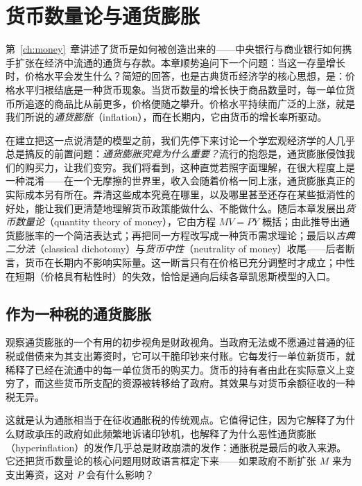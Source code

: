 \chapter{货币数量论与通货膨胀}
\label{ch:quantity}

第~\ref{ch:money}~章讲述了货币是如何被创造出来的——中央银行与商业银行如何携手扩张在经济中流通的通货与存款。本章顺势追问下一个问题：当这一存量增长时，价格水平会发生什么？简短的回答，也是古典货币经济学的核心思想，是：价格水平归根结底是一种货币现象。当货币数量的增长快于商品数量时，每一单位货币所追逐的商品比从前更多，价格便随之攀升。价格水平持续而广泛的上涨，就是我们所说的\emph{通货膨胀}（inflation），而在长期内，它由货币的增长率所驱动。

在建立把这一点说清楚的模型之前，我们先停下来讨论一个学宏观经济学的人几乎总是搞反的前置问题：\emph{通货膨胀究竟为什么重要？}流行的抱怨是，通货膨胀侵蚀我们的购买力，让我们变穷。我们将看到，这种直觉若照字面理解，在很大程度上是一种混淆——在一个无摩擦的世界里，收入会随着价格一同上涨，通货膨胀真正的实际成本另有所在。弄清这些成本究竟在哪里，以及哪里甚至还存在某些抵消性的好处，能让我们更清楚地理解货币政策能做什么、不能做什么。随后本章发展出\emph{货币数量论}（quantity theory of money），它由方程 $MV = PY$ 概括；由此推导出通货膨胀率的一个简洁表达式；再把同一方程改写成一种货币需求理论；最后以\emph{古典二分法}（classical dichotomy）与\emph{货币中性}（neutrality of money）收尾——后者断言，货币在长期内不影响实际量。这一断言只有在价格已充分调整时才成立；中性在短期（价格具有粘性时）的失效，恰恰是通向后续各章凯恩斯模型的入口。

\section{作为一种税的通货膨胀}

观察通货膨胀的一个有用的初步视角是财政视角。当政府无法或不愿通过普通的征税或借债来为其支出筹资时，它可以干脆印钞来付账。它每发行一单位新货币，就稀释了已经在流通中的每一单位货币的购买力。货币的持有者由此在实际意义上变穷了，而这些货币所支配的资源被转移给了政府。其效果与对货币余额征收的一种税无异。


这就是认为通胀相当于在征收通胀税的传统观点。它值得记住，因为它解释了为什么财政承压的政府如此频繁地诉诸印钞机，也解释了为什么恶性通货膨胀（hyperinflation）的发作几乎总是财政崩溃的发作：通胀税是最后的收入来源。它还把货币数量论的核心问题用财政语言框定下来——如果政府不断扩张 $M$ 来为支出筹资，这对 $P$ 会有什么影响？

